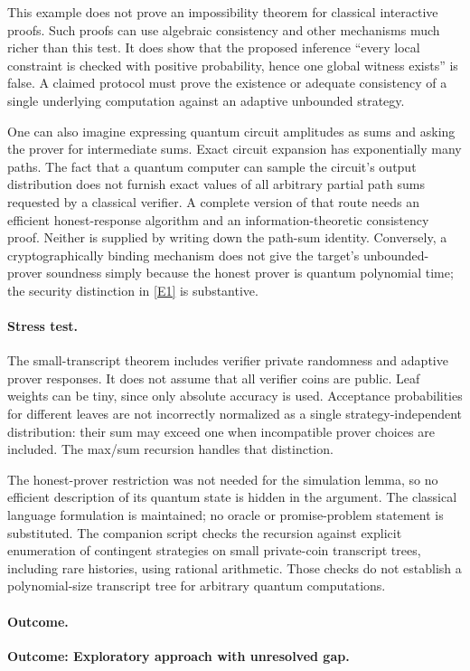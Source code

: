 \documentclass[11pt,a4paper]{article}
\newcommand{\eref}[2]{\hyperlink{extra:#1:#2}{[E#2]}}
\numberwithin{equation}{section}
\begin{document}
This example does not prove an impossibility theorem for classical
interactive proofs.  Such proofs can use algebraic consistency and
other mechanisms much richer than this test.  It does show that the
proposed inference ``every local constraint is checked with positive
probability, hence one global witness exists'' is false.  A claimed
protocol must prove the existence or adequate consistency of a single
underlying computation against an adaptive unbounded strategy.

One can also imagine expressing quantum circuit amplitudes as sums
and asking the prover for intermediate sums.  Exact circuit expansion
has exponentially many paths.  The fact that a quantum computer can
sample the circuit's output distribution does not furnish exact values
of all arbitrary partial path sums requested by a classical verifier.
A complete version of that route needs an efficient honest-response
algorithm and an information-theoretic consistency proof.  Neither
is supplied by writing down the path-sum identity.  Conversely, a
cryptographically binding mechanism does not give the target's
unbounded-prover soundness simply because the honest prover is quantum
polynomial time; the security distinction in \eref{30006741}{1} is substantive.

\paragraph{Stress test.}
The small-transcript theorem includes verifier private randomness and
adaptive prover responses.  It does not assume that all verifier coins
are public.  Leaf weights can be tiny, since only absolute accuracy is
used.  Acceptance probabilities for different leaves are not incorrectly
normalized as a single strategy-independent distribution: their sum
may exceed one when incompatible prover choices are included.  The
max/sum recursion handles that distinction.

The honest-prover restriction was not needed for the simulation lemma,
so no efficient description of its quantum state is hidden in the
argument.  The classical language formulation is maintained; no
oracle or promise-problem statement is substituted.  The companion
script checks the recursion against explicit enumeration of contingent
strategies on small private-coin transcript trees, including rare
histories, using rational arithmetic.  Those checks do not establish a
polynomial-size transcript tree for arbitrary quantum computations.

\paragraph{Outcome.}
\textbf{Outcome: Exploratory approach with unresolved gap.}
\end{document}
